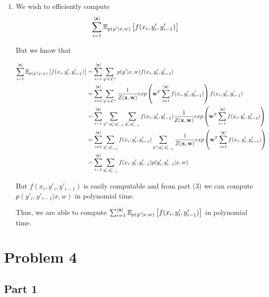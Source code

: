 \documentclass{article}
\begin{document}
\begin{enumerate}
\item
We wish to efficiently compute
\begin{equation*}
\sum_{i=1}^{|{\bf x}|}\mathbb{E}_{p(y'|x,w)}\left[ f(x_i,y'_i,y'_{i-1})\right]
\end{equation*}

But we know that

\begin{equation*}
\begin{split}
\sum_{i=1}^{|{\bf x}|}\mathbb{E}_{p(y'|x,w)}\left[ f(x_i,y'_i,y'_{i-1})\right] &= \sum_{i=1}^{|{\bf x}|}\sum_{y'\in\mathcal{L}^n}{p(y'|x,w)}f(x_i,y'_i,y'_{i-1})\\
&= \sum_{i=1}^{|{\bf x}|}\sum_{y'\in\mathcal{L}^n}{\frac{1}{Z({\bf x}, {\bf w})}}exp\left({\bf w}^T \sum_{i=1}^{|{\bf x}|}f(x_i,y'_i,y'_{i-1})\right)f(x_i,y'_i,y'_{i-1})\\
&=  \sum_{i=1}^{|{\bf x}|}\sum_{y'\backslash y'_i,y'_{i-1}}\sum_{y'_i,y'_{i-1}}f(x_i,y'_i,y'_{i-1}) \frac{1}{Z({\bf x}, {\bf w})}exp\left({\bf w}^T \sum_{i=1}^{|{\bf x}|}f(x_i,y'_i,y'_{i-1})\right)\\
&=  \sum_{i=1}^{|{\bf x}|}\sum_{y'_i,y'_{i-1}}f(x_i,y'_i,y'_{i-1}) \sum_{y'\backslash y'_i,y'_{i-1}}\frac{1}{Z({\bf x}, {\bf w})}exp\left({\bf w}^T \sum_{i=1}^{|{\bf x}|}f(x_i,y'_i,y'_{i-1})\right)\\
&=  \sum_{i=1}^{|{\bf x}|}\sum_{y'_i,y'_{i-1}}f(x_i,y'_i,y'_{i-1}) p(y'_i,y'_{i-1}|x,w)
\end{split}
\end{equation*}

But $f(x_i,y'_i,y'_{i-1})$ is easily computable and from part (3) we can compute $p(y'_i,y'_{i-1}|x,w)$ in polynomial time.

Thus, we are able to compute $\sum_{i=1}^{|{\bf x}|}\mathbb{E}_{p(y'|x,w)}\left[ f(x_i,y'_i,y'_{i-1})\right]$ in polynomial time.


\end{enumerate}



\section*{Problem 4}


\subsection*{Part 1}
\end{document}
